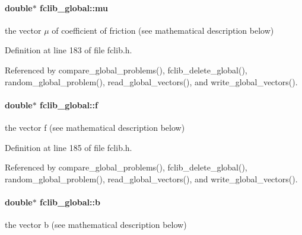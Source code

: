 \hypertarget{structfclib__global_a99fd8c775c35a6a0e233df1f8cae181a}{}
\paragraph[{mu}]{\setlength{\rightskip}{0pt plus 5cm}double$\ast$ fclib\+\_\+global\+::mu}\label{structfclib__global_a99fd8c775c35a6a0e233df1f8cae181a}


the vector $\mu$ of coefficient of friction (see mathematical description below) 



Definition at line 183 of file fclib.\+h.



Referenced by compare\+\_\+global\+\_\+problems(), fclib\+\_\+delete\+\_\+global(), random\+\_\+global\+\_\+problem(), read\+\_\+global\+\_\+vectors(), and write\+\_\+global\+\_\+vectors().

\hypertarget{structfclib__global_a6d5d0d1f9169b886eb3d3aca0632e8a9}{}
\paragraph[{f}]{\setlength{\rightskip}{0pt plus 5cm}double$\ast$ fclib\+\_\+global\+::f}\label{structfclib__global_a6d5d0d1f9169b886eb3d3aca0632e8a9}


the vector f (see mathematical description below) 



Definition at line 185 of file fclib.\+h.



Referenced by compare\+\_\+global\+\_\+problems(), fclib\+\_\+delete\+\_\+global(), random\+\_\+global\+\_\+problem(), read\+\_\+global\+\_\+vectors(), and write\+\_\+global\+\_\+vectors().

\hypertarget{structfclib__global_a1badf3df92b120566a2ee3c42194972f}{}
\paragraph[{b}]{\setlength{\rightskip}{0pt plus 5cm}double$\ast$ fclib\+\_\+global\+::b}\label{structfclib__global_a1badf3df92b120566a2ee3c42194972f}


the vector b (see mathematical description below) 



